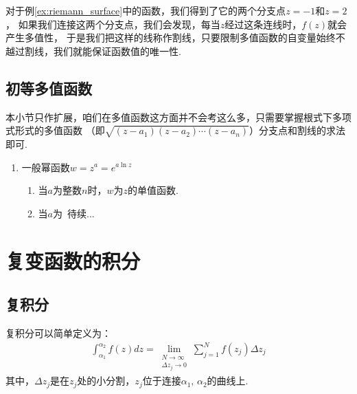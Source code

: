 \documentclass[lang=cn, titlestyle=display, scheme=chinese]{elegantbook}
\begin{document}
                对于例\ref{ex:riemann_surface}中的函数，我们得到了它的两个分支点$z = -1$和$z = 2$，
                如果我们连接这两个分支点，我们会发现，每当$z$经过这条连线时，$f(z)$就会产生多值性，
                于是我们把这样的线称作割线，只要限制多值函数的自变量始终不越过割线，我们就能保证函数值的唯一性.
                

            \subsection{初等多值函数}
                本小节只作扩展，咱们在多值函数这方面并不会考这么多，只需要掌握根式下多项式形式的多值函数
                （即$\sqrt{(z - a_1)(z - a_2)\cdots(z - a_n)}$）分支点和割线的求法即可.

                \begin{enumerate}
                    \item 一般幂函数$w = z^a = e^{a \ln{z}}$
                        \begin{enumerate}[(1)]
                            \item 当$a$为整数$n$时，$w$为$z$的单值函数.
                            \item 当$a$为\ 待续... %
                        \end{enumerate}
                \end{enumerate}

        \section{复变函数的积分}

            \subsection{复积分}
                \begin{definition}[复积分]\label{the:complex_integral}
                    复积分可以简单定义为：
                    \begin{align*}
                        \int_{\alpha_1}^{\alpha_2}f(z)dz 
                        = \lim_{\substack{N \to \infty \\
                        \varDelta z_j \to 0}}
                        \sum_{j = 1}^{N}f(z_j)\varDelta z_j
                    \end{align*}
                    其中，$\varDelta z_j$是在$z_j$处的小分割，$z_j$位于连接$\alpha_1, \, \alpha_2$的曲线上.
                \end{definition}
\end{document}
